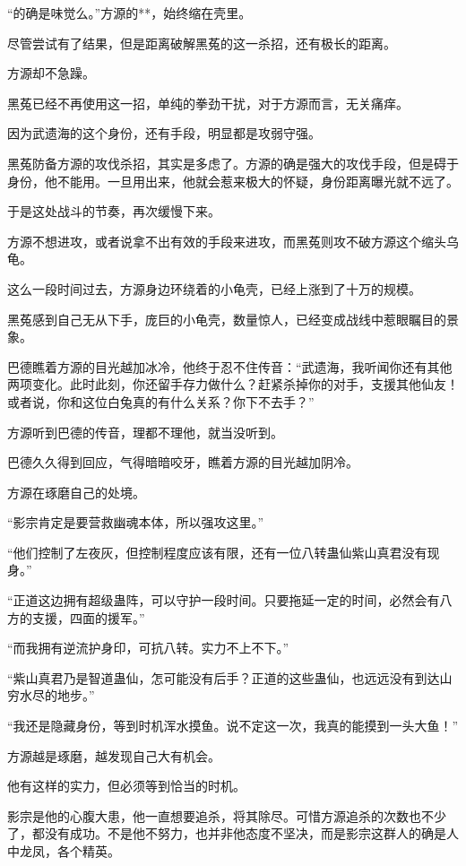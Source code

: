 \begin{this_body}
“的确是味觉么。”方源的**，始终缩在壳里。

尽管尝试有了结果，但是距离破解黑菟的这一杀招，还有极长的距离。

方源却不急躁。

黑菟已经不再使用这一招，单纯的拳劲干扰，对于方源而言，无关痛痒。

因为武遗海的这个身份，还有手段，明显都是攻弱守强。

黑菟防备方源的攻伐杀招，其实是多虑了。方源的确是强大的攻伐手段，但是碍于身份，他不能用。一旦用出来，他就会惹来极大的怀疑，身份距离曝光就不远了。

于是这处战斗的节奏，再次缓慢下来。

方源不想进攻，或者说拿不出有效的手段来进攻，而黑菟则攻不破方源这个缩头乌龟。

这么一段时间过去，方源身边环绕着的小龟壳，已经上涨到了十万的规模。

黑菟感到自己无从下手，庞巨的小龟壳，数量惊人，已经变成战线中惹眼瞩目的景象。

巴德瞧着方源的目光越加冰冷，他终于忍不住传音：“武遗海，我听闻你还有其他两项变化。此时此刻，你还留手存力做什么？赶紧杀掉你的对手，支援其他仙友！或者说，你和这位白兔真的有什么关系？你下不去手？”

方源听到巴德的传音，理都不理他，就当没听到。

巴德久久得到回应，气得暗暗咬牙，瞧着方源的目光越加阴冷。

方源在琢磨自己的处境。

“影宗肯定是要营救幽魂本体，所以强攻这里。”

“他们控制了左夜灰，但控制程度应该有限，还有一位八转蛊仙紫山真君没有现身。”

“正道这边拥有超级蛊阵，可以守护一段时间。只要拖延一定的时间，必然会有八方的支援，四面的援军。”

“而我拥有逆流护身印，可抗八转。实力不上不下。”

“紫山真君乃是智道蛊仙，怎可能没有后手？正道的这些蛊仙，也远远没有到达山穷水尽的地步。”

“我还是隐藏身份，等到时机浑水摸鱼。说不定这一次，我真的能摸到一头大鱼！”

方源越是琢磨，越发现自己大有机会。

他有这样的实力，但必须等到恰当的时机。

影宗是他的心腹大患，他一直想要追杀，将其除尽。可惜方源追杀的次数也不少了，都没有成功。不是他不努力，也并非他态度不坚决，而是影宗这群人的确是人中龙凤，各个精英。


\end{this_body}
